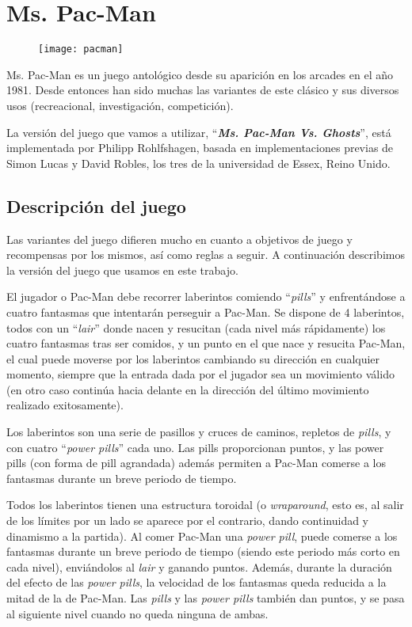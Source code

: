 \chapter{Ms. Pac-Man}
\begin{figure}[H]
\centering
\texttt{[image: pacman]}
\end{figure}

Ms. Pac-Man es un juego antológico desde su aparición en los arcades en el año 1981. Desde entonces han sido muchas las variantes de este clásico y sus diversos usos (recreacional, investigación, competición).
 
La versión del juego que vamos a utilizar, ``\textbf{\textit{Ms. Pac-Man Vs. Ghosts}}''\cite{pacmanvsghostsTournamentPage}\cite{pacmanvsghostsGit}, está implementada por Philipp Rohlfshagen, basada en implementaciones previas de Simon Lucas y David Robles, los tres de la universidad de Essex, Reino Unido.


\section{Descripción del juego}
Las variantes del juego difieren mucho en cuanto a objetivos de juego y recompensas por los mismos, así como reglas a seguir. A continuación describimos la versión del juego que usamos en este trabajo.

El jugador o Pac-Man debe recorrer laberintos comiendo ``\textit{pills}'' y enfrentándose a cuatro fantasmas que intentarán perseguir a Pac-Man. Se dispone de 4 laberintos, todos con un ``\textit{lair}'' donde nacen y resucitan (cada nivel más rápidamente) los cuatro fantasmas tras ser comidos, y un punto en el que nace y resucita Pac-Man, el cual puede moverse por los laberintos cambiando su dirección en cualquier momento, siempre que la entrada dada por el jugador sea un movimiento válido (en otro caso continúa hacia delante en la dirección del último movimiento realizado exitosamente).
 
\blankline

Los laberintos son una serie de pasillos y cruces de caminos, repletos de \textit{pills}, y con cuatro ``\textit{power pills}'' cada uno. Las pills proporcionan puntos, y las power pills (con forma de pill agrandada) además permiten a Pac-Man comerse a los fantasmas durante un breve periodo de tiempo.

Todos los laberintos tienen una estructura toroidal (o \textit{wraparound}, esto es, al salir de los límites por un lado se aparece por el contrario, dando continuidad y dinamismo a la partida). Al comer Pac-Man una \textit{power pill}, puede comerse a los fantasmas durante un breve periodo de tiempo (siendo este periodo más corto en cada nivel), enviándolos al \textit{lair} y ganando puntos. Además, durante la duración del efecto de las \textit{power pills}, la velocidad de los fantasmas queda reducida a la mitad de la de Pac-Man. Las \textit{pills} y las \textit{power pills} también dan puntos, y se pasa al siguiente nivel cuando no queda ninguna de ambas.
 
